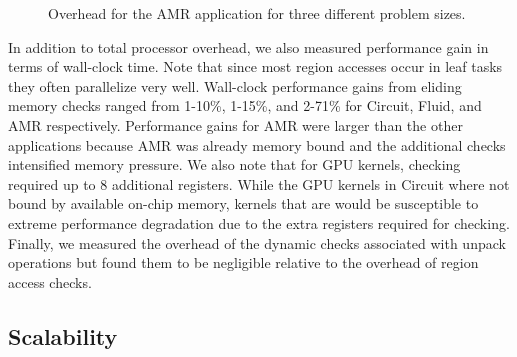 \begin{figure}
\begin{center}
{\label{fig:amr16384}
}
\end{center}
\vspace{-2mm}
\caption{Overhead for the AMR application for three different problem sizes.\label{fig:amr_overhead}}
\vspace{-6mm}
\end{figure}

In addition to total processor overhead, we also measured performance gain in terms of wall-clock
time.  Note that since most region accesses occur in leaf tasks they often parallelize
very well.  Wall-clock performance gains from eliding memory checks ranged from 1-10\%, 1-15\%, 
and 2-71\% for Circuit, Fluid, and AMR respectively.  Performance gains for AMR were larger than
the other applications because AMR was already memory bound and the additional checks intensified
memory pressure.  We also note that for GPU kernels, checking required up to 8 additional registers.  
While the GPU kernels in Circuit where not bound by 
available on-chip memory, kernels that are would be susceptible to extreme performance 
degradation due to the extra registers required for checking.  Finally, we measured the overhead
of the dynamic checks associated with unpack operations but found them to be negligible relative
to the overhead of region access checks.

\subsection{Scalability}
\label{subsec:scalability}

